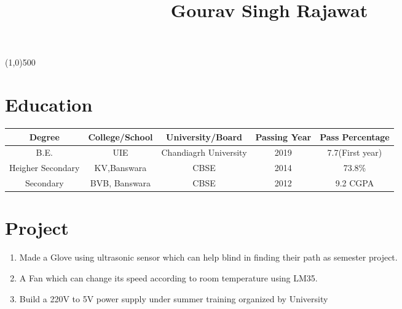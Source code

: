 \documentclass[11pt,a4paper]{article}
\def\sline{

    \vspace{-5.5em}
    \hspace{\fill}\line(1,0){500}\hspace{\fill}
}%
\begin{document}
\title{Gourav Singh Rajawat}%
\author{}
\date{}
\maketitle
\sline  %
\begin{multicols}{2} %
\columnbreak %
\end{multicols} %

\section*{Education} %
\vspace{-0.7em}\hline \vspace{1.5em} %
	\begin{tabular}{|c|c|c|c|c|} %
	\hline %
	Degree & College/School & University/Board & Passing Year & Pass Percentage \\
	\hline
	B.E. &UIE &Chandiagrh University &2019 &7.7(First year) \\
	\hline
	Heigher Secondary &KV,Banswara &CBSE &2014 & 73.8\% \\ \hline
	Secondary &BVB, Banswara &CBSE &2012 &9.2 CGPA \\ \hline
	\end{tabular}	%
	
	
\section*{Project}
\vspace{-0.7em}\hline \vspace{1.5em}
\begin{enumerate} %

\item Made a Glove using ultrasonic sensor which can help blind in finding their path as semester project. 

\item A Fan which can change its speed according to room temperature using LM35. 

\item Build a 220V to 5V power supply under summer training organized by University
\end{enumerate}
\end{document}
